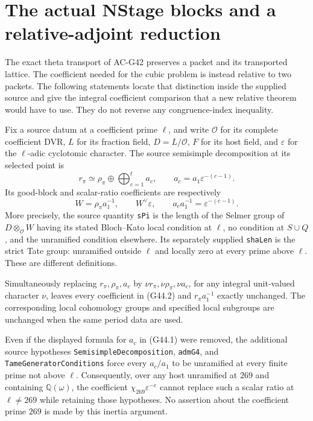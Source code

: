 \section{The actual NStage blocks and a relative-adjoint reduction}
\label{sec:relative-nstage-blocks}

The exact theta transport of AC-G42 preserves a packet and its
transported lattice.  The coefficient needed for the cubic problem
is instead relative to two packets.  The following statements locate
that distinction inside the supplied source and give the integral
coefficient comparison that a new relative theorem would have to use.
They do not reverse any congruence-index inequality.

\begin{proposition}
\label{AC-G44}
Fix a source datum at a coefficient prime $\ell$, and write
$\mathcal O$ for its complete coefficient DVR, $L$ for its fraction
field, $D=L/\mathcal O$, $F$ for its host field, and
$\varepsilon$ for the $\ell$-adic cyclotomic character.
The source semisimple decomposition at its selected point is
\[
 r_\pi\simeq\rho_\pi\oplus\bigoplus_{c=1}^{t}a_c,
 \qquad a_c=a_1\varepsilon^{-(c-1)}.                 \tag{G44.1}
\]
Its good-block and scalar-ratio coefficients are respectively
\[
 W=\rho_\pi a_1^{-1},\qquad
 W^\vee\varepsilon,\qquad a_ca_1^{-1}
                   =\varepsilon^{-(c-1)}.          \tag{G44.2}
\]
More precisely, the source quantity \texttt{sPi} is the length
of the Selmer group of $D\otimes_{\mathcal O}W$ having its stated
Bloch--Kato local condition at $\ell$, no condition at $S\cup Q$,
and the unramified condition elsewhere.  Its separately supplied
\texttt{shaLen} is the strict Tate group: unramified outside
$\ell$ and locally zero at every prime above $\ell$.
These are different definitions.

Simultaneously replacing $r_\pi,\rho_\pi,a_c$ by
$\nu r_\pi,\nu\rho_\pi,\nu a_c$, for any integral unit-valued
character $\nu$, leaves every coefficient in (G44.2) and
$r_\pi a_1^{-1}$ exactly unchanged.  The corresponding local
cohomology groups and specified local subgroups are unchanged
when the same period data are used.

Even if the displayed formula for $a_c$ in (G44.1) were removed,
the additional source hypotheses
\texttt{SemisimpleDecomposition}, \texttt{admG4}, and
\texttt{TameGeneratorConditions} force every $a_c/a_1$ to be
unramified at every finite prime not above $\ell$.
Consequently, over any host unramified at $269$ and containing
$\mathbb Q(\omega)$, the coefficient
$\chi_{269}\varepsilon^{-e}$ cannot replace such a scalar ratio
at $\ell\ne269$ while retaining those hypotheses.
No assertion about the coefficient prime $269$ is made by this
inertia argument.


\end{proposition}
